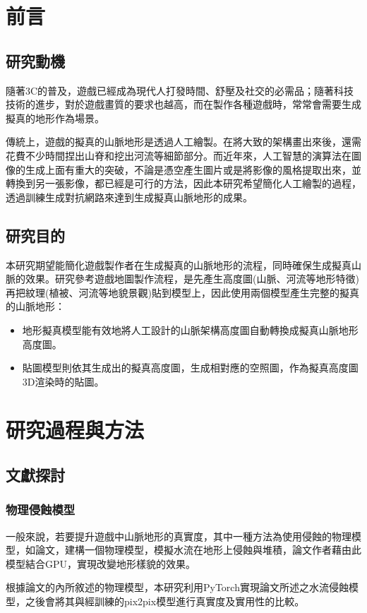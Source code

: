 \documentclass[a4paper, 12pt]{article}
\begin{document}
\section{前言}
\subsection{研究動機}
隨著3C的普及，遊戲已經成為現代人打發時間、舒壓及社交的必需品；隨著科技技術的進步，對於遊戲畫質的要求也越高，而在製作各種遊戲時，常常會需要生成擬真的地形作為場景。

傳統上，遊戲的擬真的山脈地形是透過人工繪製。在將大致的架構畫出來後，還需花費不少時間捏出山脊和挖出河流等細節部分。而近年來，人工智慧的演算法在圖像的生成上面有重大的突破，不論是憑空產生圖片或是將影像的風格提取出來，並轉換到另一張影像，都已經是可行的方法，因此本研究希望簡化人工繪製的過程，透過訓練生成對抗網路來達到生成擬真山脈地形的成果。

\subsection{研究目的}
本研究期望能簡化遊戲製作者在生成擬真的山脈地形的流程，同時確保生成擬真山脈的效果。研究參考遊戲地圖製作流程，是先產生高度圖(山脈、河流等地形特徵)再把紋理(植被、河流等地貌景觀)貼到模型上，因此使用兩個模型產生完整的擬真的山脈地形：
\begin{itemize}
    \item 地形擬真模型能有效地將人工設計的山脈架構高度圖自動轉換成擬真山脈地形高度圖。
    \item 貼圖模型則依其生成出的擬真高度圖，生成相對應的空照圖，作為擬真高度圖3D渲染時的貼圖。
\end{itemize}

\section{研究過程與方法}
\subsection{文獻探討}
\subsubsection{物理侵蝕模型}
一般來說，若要提升遊戲中山脈地形的真實度，其中一種方法為使用侵蝕的物理模型，如論文\cite{jako2011fast}，建構一個物理模型，模擬水流在地形上侵蝕與堆積，論文作者藉由此模型結合GPU，實現改變地形樣貌的效果。

根據論文\cite{jako2011fast}的內所敘述的物理模型，本研究利用PyTorch實現論文\cite{jako2011fast}所述之水流侵蝕模型，之後會將其與經訓練的pix2pix模型進行真實度及實用性的比較。
\end{document}
